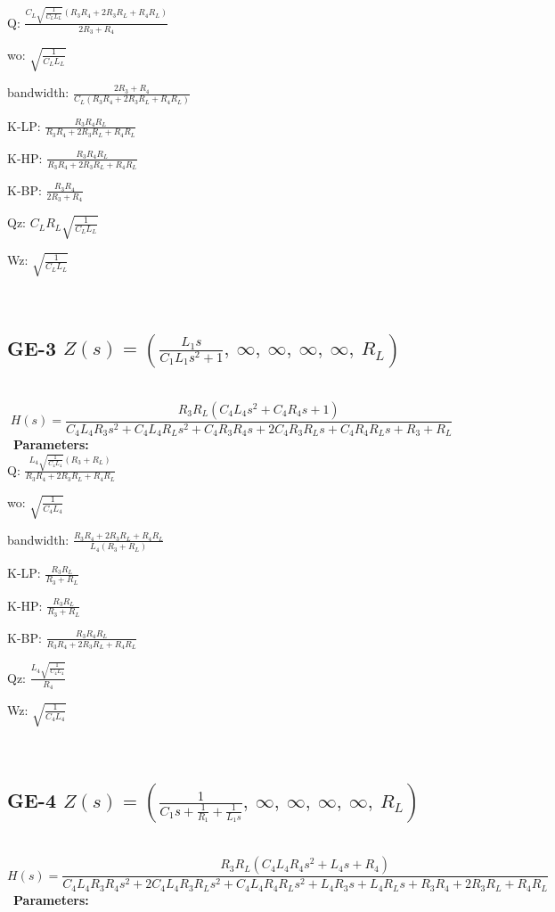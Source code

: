 \documentclass{article}
\begin{document}
Q: $\frac{C_{L} \sqrt{\frac{1}{C_{L} L_{L}}} \left(R_{3} R_{4} + 2 R_{3} R_{L} + R_{4} R_{L}\right)}{2 R_{3} + R_{4}}$\ 

wo: $\sqrt{\frac{1}{C_{L} L_{L}}}$\ 

bandwidth: $\frac{2 R_{3} + R_{4}}{C_{L} \left(R_{3} R_{4} + 2 R_{3} R_{L} + R_{4} R_{L}\right)}$\ 

K-LP: $\frac{R_{3} R_{4} R_{L}}{R_{3} R_{4} + 2 R_{3} R_{L} + R_{4} R_{L}}$\ 

K-HP: $\frac{R_{3} R_{4} R_{L}}{R_{3} R_{4} + 2 R_{3} R_{L} + R_{4} R_{L}}$\ 

K-BP: $\frac{R_{3} R_{4}}{2 R_{3} + R_{4}}$\ 

Qz: $C_{L} R_{L} \sqrt{\frac{1}{C_{L} L_{L}}}$\ 

Wz: $\sqrt{\frac{1}{C_{L} L_{L}}}$\ 

\ 

\subsection{GE-3 $Z(s) = \left( \frac{L_{1} s}{C_{1} L_{1} s^{2} + 1}, \  \infty, \  \infty, \  \infty, \  \infty, \  R_{L}\right)$ } \ 
\textbf{\[H(s) = \frac{R_{3} R_{L} \left(C_{4} L_{4} s^{2} + C_{4} R_{4} s + 1\right)}{C_{4} L_{4} R_{3} s^{2} + C_{4} L_{4} R_{L} s^{2} + C_{4} R_{3} R_{4} s + 2 C_{4} R_{3} R_{L} s + C_{4} R_{4} R_{L} s + R_{3} + R_{L}}\] } \ 
\textbf{Parameters:}\\ 

Q: $\frac{L_{4} \sqrt{\frac{1}{C_{4} L_{4}}} \left(R_{3} + R_{L}\right)}{R_{3} R_{4} + 2 R_{3} R_{L} + R_{4} R_{L}}$\ 

wo: $\sqrt{\frac{1}{C_{4} L_{4}}}$\ 

bandwidth: $\frac{R_{3} R_{4} + 2 R_{3} R_{L} + R_{4} R_{L}}{L_{4} \left(R_{3} + R_{L}\right)}$\ 

K-LP: $\frac{R_{3} R_{L}}{R_{3} + R_{L}}$\ 

K-HP: $\frac{R_{3} R_{L}}{R_{3} + R_{L}}$\ 

K-BP: $\frac{R_{3} R_{4} R_{L}}{R_{3} R_{4} + 2 R_{3} R_{L} + R_{4} R_{L}}$\ 

Qz: $\frac{L_{4} \sqrt{\frac{1}{C_{4} L_{4}}}}{R_{4}}$\ 

Wz: $\sqrt{\frac{1}{C_{4} L_{4}}}$\ 

\ 

\subsection{GE-4 $Z(s) = \left( \frac{1}{C_{1} s + \frac{1}{R_{1}} + \frac{1}{L_{1} s}}, \  \infty, \  \infty, \  \infty, \  \infty, \  R_{L}\right)$ } \ 
\textbf{\[H(s) = \frac{R_{3} R_{L} \left(C_{4} L_{4} R_{4} s^{2} + L_{4} s + R_{4}\right)}{C_{4} L_{4} R_{3} R_{4} s^{2} + 2 C_{4} L_{4} R_{3} R_{L} s^{2} + C_{4} L_{4} R_{4} R_{L} s^{2} + L_{4} R_{3} s + L_{4} R_{L} s + R_{3} R_{4} + 2 R_{3} R_{L} + R_{4} R_{L}}\] } \ 
\textbf{Parameters:}\\ 
\end{document}
